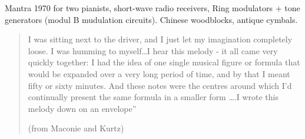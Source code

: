 Mantra 1970 for two pianists, short-wave radio receivers, Ring modulators + tone generators (modul B mudulation circuits). Chinese woodblocks, antique cymbals.

\begin{quotation}I was sitting next to the driver, and I just let my imagination completely loose. I was humming to myself…I hear this melody - it all came very quickly together: I had the idea of one single musical figure or formula that would be expanded over a very long period of time, and by that I meant fifty or sixty minutes. And these notes were the centres around which I'd continually present the same formula in a smaller form ….I wrote this melody down on an envelope''

(from Maconie and Kurtz)
\end{quotation}
